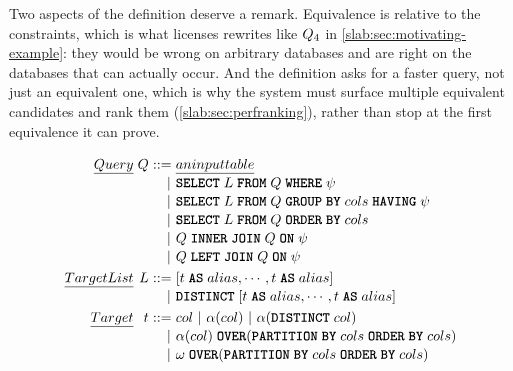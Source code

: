 Two aspects of the definition deserve a remark. Equivalence is
relative to the constraints, which is what licenses rewrites like
$Q_4$ in \cref{slab:sec:motivating-example}: they would be wrong
on arbitrary databases and are right on the databases that can
actually occur. And the definition asks for a faster query, not just
an equivalent one, which is why the system must surface multiple
equivalent candidates and rank them (\cref{slab:sec:perfranking}),
rather than stop at the first equivalence it can prove.



\begin{figure}[!t]
\footnotesize
\centering
\[
\arraycolsep=1.5pt\def\arraystretch{1.1}
\begin{array}{rrll}

\emph{Query} & 
\query & 
\grammareq & 
\emph{an input table} \\ 
& & \ \ \ | &  
\sqlselect \sqlspace \targetlist \sqlspace \sqlfrom \sqlspace \query \sqlspace \sqlwhere \sqlspace \sqlpredicate \\ 
& & \ \ \ | &  
\sqlselect \sqlspace \targetlist \sqlspace \sqlfrom \sqlspace \query \sqlspace \sqlgroupby \sqlspace \cols \sqlspace \sqlhaving \sqlspace \sqlpredicate \\ 
& & \ \ \ | &  
\sqlselect \sqlspace \targetlist \sqlspace \sqlfrom \sqlspace \query \sqlspace \sqlorderby \sqlspace \cols  \\ 
& & \ \ \ | &  
\query \sqlspace \sqlinnerjoin \sqlspace \query \sqlspace \sqlon \sqlspace \sqlpredicate \\ 
& & \ \ \ | &  
\query \sqlspace \sqlleftjoin \sqlspace \query \sqlspace \sqlon \sqlspace \sqlpredicate 
\\[2pt]

\emph{Target List} & 
\targetlist & 
\grammareq & 
[ \target \sqlspace \sqlas \sqlspace \colalias, \mydots, \target \sqlspace \sqlas \sqlspace \colalias ]
\\
& & \ \ \ | &  
\sqldistinct \sqlspace [ \target \sqlspace \sqlas \sqlspace \colalias, \mydots, \target \sqlspace \sqlas \sqlspace \colalias ] 
\\[2pt]

\emph{Target} & 
\target & 
\grammareq & 
\col \ | \ \agg(\col) \ | \ \agg( \sqldistinct \sqlspace \col) 
\\
& & \ \ \ | &  
\agg(\col) \sqlspace \sqlover( \sqlpartitionby \sqlspace \cols \sqlspace \sqlorderby \sqlspace \cols )
\\ 
& & \ \ \ | &  
\windowfunc \sqlspace \sqlover( \sqlpartitionby \sqlspace \cols \sqlspace \sqlorderby \sqlspace \cols )
\\[2pt] 


\end{array}\]
\end{figure}

